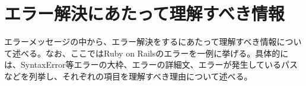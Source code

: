 \documentclass[main]{subfiles}
\begin{document}
\chapter{エラー解決にあたって理解すべき情報}
エラーメッセージの中から、エラー解決をするにあたって理解すべき情報について述べる。なお、ここではRuby on Railsのエラーを一例に挙げる。具体的には、SyntaxError等エラーの大枠、エラーの詳細文、エラーが発生しているパスなどを列挙し、それぞれの項目を理解すべき理由について述べる。

\end{document}
